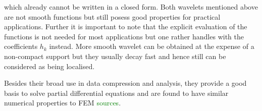 which already cannot be written in a closed form.
Both wavelets mentioned above are not smooth functions but still posess good properties for practical applications.
Further it is important to note that the explicit evaluation of the functions is not needed for most applications but one rather handles with the coefficients $h_k$ instead.
More smooth wavelet can be obtained at the expense of a non-compact support but they usually decay fast and hence still can be considered as being localised.

Besides their broad use in data compression and analysis, they provide a good basis to solve partial differential equations and are found to have similar numerical properties to FEM \textcolor{green}{sources}\cite{FdFeWavelet}.

